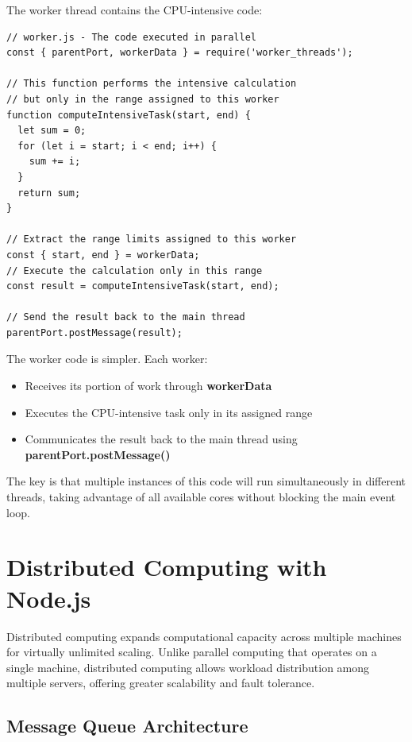 \documentclass[12pt,letterpaper]{article}
\newenvironment{macterminal}{%
    \begin{mdframed}[
        linecolor=terminalFrame,
        backgroundcolor=terminalBg,
        roundcorner=5pt,
        skipabove=5pt,
        skipbelow=5pt,
        linewidth=1pt,
        innertopmargin=5pt,
        frametitle={%
            \tikz[baseline=(current bounding box.east), outer sep=0pt]{
                \fill[red!80!black] (0,0) circle (5pt);
                \fill[yellow!80!black] (0.7,0) circle (5pt);
                \fill[green!70!black] (1.4,0) circle (5pt);
            }
        },
        frametitlealignment=\raggedright,
        frametitleaboveskip=8pt,
        frametitlebelowskip=0pt,
    ]
}{%
    \end{mdframed}%
}
\begin{document}
The worker thread contains the CPU-intensive code:

\begin{macterminal}
\begin{lstlisting}
// worker.js - The code executed in parallel
const { parentPort, workerData } = require('worker_threads');

// This function performs the intensive calculation
// but only in the range assigned to this worker
function computeIntensiveTask(start, end) {
  let sum = 0;
  for (let i = start; i < end; i++) {
    sum += i;
  }
  return sum;
}

// Extract the range limits assigned to this worker
const { start, end } = workerData;
// Execute the calculation only in this range
const result = computeIntensiveTask(start, end);

// Send the result back to the main thread
parentPort.postMessage(result);
\end{lstlisting}
\end{macterminal}

The worker code is simpler. Each worker:
\begin{itemize}
    \item Receives its portion of work through \textbf{\textcolor{accentColor}{workerData}}
    \item Executes the CPU-intensive task only in its assigned range
    \item Communicates the result back to the main thread using \textbf{\textcolor{accentColor}{parentPort.postMessage()}}
\end{itemize}

The key is that multiple instances of this code will run simultaneously in different threads, taking advantage of all available cores without blocking the main event loop.

\section{Distributed Computing with Node.js}

Distributed computing expands computational capacity across multiple machines for virtually unlimited scaling. Unlike parallel computing that operates on a single machine, distributed computing allows workload distribution among multiple servers, offering greater scalability and fault tolerance.

\subsection{Message Queue Architecture}
\end{document}
